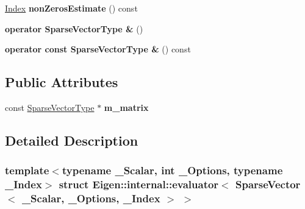 \begin{DoxyCompactItemize}
\mbox{\label{struct_eigen_1_1internal_1_1evaluator_3_01_sparse_vector_3_01___scalar_00_01___options_00_01___index_01_4_01_4_aa99ce8e966ecf1a8f019db35dc62027e}} 
\hyperlink{namespace_eigen_a62e77e0933482dafde8fe197d9a2cfde}{Index} {\bfseries non\+Zeros\+Estimate} () const
\item 
\mbox{\label{struct_eigen_1_1internal_1_1evaluator_3_01_sparse_vector_3_01___scalar_00_01___options_00_01___index_01_4_01_4_a0e5f88cb7aabb955ae0601df852c2340}} 
{\bfseries operator Sparse\+Vector\+Type \&} ()
\item 
\mbox{\label{struct_eigen_1_1internal_1_1evaluator_3_01_sparse_vector_3_01___scalar_00_01___options_00_01___index_01_4_01_4_adcf04c44e52dd68b45506608fabb7f13}} 
{\bfseries operator const Sparse\+Vector\+Type \&} () const
\end{DoxyCompactItemize}
\subsection*{Public Attributes}
\begin{DoxyCompactItemize}
\item 
\mbox{\label{struct_eigen_1_1internal_1_1evaluator_3_01_sparse_vector_3_01___scalar_00_01___options_00_01___index_01_4_01_4_a19e75dbda1fd91bcf0c22eeec463d70b}} 
const \hyperlink{group___sparse_core___module_class_eigen_1_1_sparse_vector}{Sparse\+Vector\+Type} $\ast$ {\bfseries m\+\_\+matrix}
\end{DoxyCompactItemize}


\subsection{Detailed Description}
\subsubsection*{template$<$typename \+\_\+\+Scalar, int \+\_\+\+Options, typename \+\_\+\+Index$>$\newline
struct Eigen\+::internal\+::evaluator$<$ Sparse\+Vector$<$ \+\_\+\+Scalar, \+\_\+\+Options, \+\_\+\+Index $>$ $>$}



